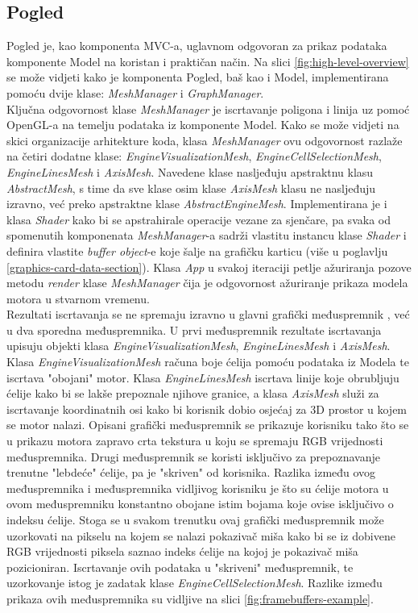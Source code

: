 \documentclass[times, utf8, diplomski]{fer}
\begin{document}
\subsection{Pogled} \label{view-section}
Pogled je, kao komponenta MVC-a, uglavnom odgovoran za prikaz podataka komponente Model na koristan i praktičan način. Na slici \ref{fig:high-level-overview} se može vidjeti kako je komponenta Pogled, baš kao i Model, implementirana pomoću dvije klase: \textit{MeshManager} i \textit{GraphManager}.\\

Ključna odgovornost klase \textit{MeshManager} je iscrtavanje poligona i linija uz pomoć OpenGL-a na temelju podataka iz komponente Model. Kako se može vidjeti na skici organizacije arhitekture koda, klasa \textit{MeshManager} ovu odgovornost razlaže na četiri dodatne klase: \textit{EngineVisualizationMesh}, \textit{EngineCellSelectionMesh}, \textit{EngineLinesMesh} i \textit{AxisMesh}. Navedene klase nasljeđuju apstraktnu klasu \textit{AbstractMesh}, s time da sve klase osim klase \textit{AxisMesh} klasu ne nasljeđuju izravno, već preko apstraktne klase \textit{AbstractEngineMesh}.
Implementirana je i klasa \textit{Shader} kako bi se apstrahirale operacije vezane za sjenčare, pa svaka od spomenutih komponenata \textit{MeshManager}-a sadrži vlastitu instancu klase \textit{Shader} i definira vlastite \textit{buffer object}-e koje šalje na grafičku karticu (više u poglavlju \ref{graphics-card-data-section}). Klasa \textit{App} u svakoj iteraciji petlje ažuriranja pozove metodu \textit{render} klase \textit{MeshManager} čija je odgovornost ažuriranje prikaza modela motora u stvarnom vremenu.\\

Rezultati iscrtavanja se ne spremaju izravno u glavni grafički međuspremnik , već u dva sporedna međuspremnika. U prvi međuspremnik rezultate iscrtavanja upisuju objekti klasa \textit{EngineVisualizationMesh}, \textit{EngineLinesMesh} i \textit{AxisMesh}. Klasa \textit{EngineVisualizationMesh} računa boje ćelija pomoću podataka iz Modela te iscrtava "obojani" motor. Klasa \textit{EngineLinesMesh} iscrtava linije koje obrubljuju ćelije kako bi se lakše prepoznale njihove granice, a klasa \textit{AxisMesh} služi za iscrtavanje koordinatnih osi kako bi korisnik dobio osjećaj za 3D prostor u kojem se motor nalazi. Opisani grafički međuspremnik se prikazuje korisniku tako što se u prikazu motora zapravo crta tekstura u koju se spremaju RGB vrijednosti međuspremnika. Drugi međuspremnik se koristi isključivo za prepoznavanje trenutne "lebdeće" ćelije, pa je "skriven" od korisnika. Razlika između ovog međuspremnika i međuspremnika vidljivog korisniku je što su ćelije motora u ovom međuspremniku konstantno obojane istim bojama koje ovise isključivo o indeksu ćelije. Stoga se u svakom trenutku ovaj grafički međuspremnik može uzorkovati na pikselu na kojem se nalazi pokazivač miša kako bi se iz dobivene RGB vrijednosti piksela saznao indeks ćelije na kojoj je pokazivač miša pozicioniran. Iscrtavanje ovih podataka u "skriveni" međuspremnik, te uzorkovanje istog je zadatak klase \textit{EngineCellSelectionMesh}. Razlike između prikaza ovih međuspremnika su vidljive na slici \ref{fig:framebuffers-example}.
\end{document}
